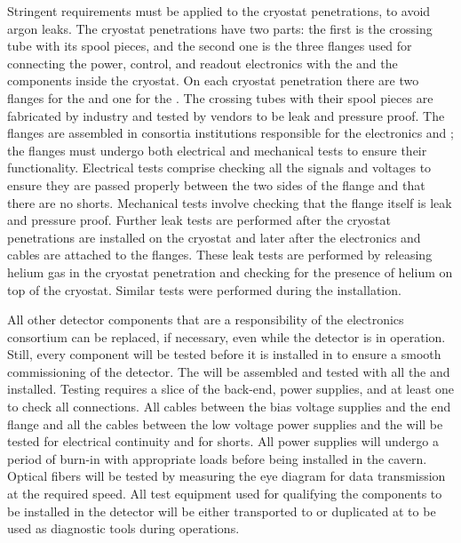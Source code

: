 Stringent requirements must be applied to the cryostat
penetrations, to avoid argon leaks. The cryostat penetrations 
have two parts: the first is the crossing tube with its spool pieces,
and the second one is the three flanges used for
connecting the power, control, and readout electronics with the
 and the  components inside the
cryostat. On each cryostat penetration there are two flanges for
the  and one for the . The crossing
tubes with their spool pieces are fabricated by industry and tested
by vendors to be leak and pressure proof. The flanges are assembled
in consortia institutions responsible for the  electronics and ; the
flanges must undergo both electrical and mechanical tests to ensure their
functionality. Electrical tests comprise checking all the
signals and voltages to ensure they are passed properly between the two sides of the
flange and that there are no shorts. Mechanical tests involve 
checking that the flange itself is leak and pressure proof. Further
leak tests are performed after the cryostat penetrations are installed
on the cryostat and later after the  electronics and 
cables are attached to the flanges. These leak tests are
performed by releasing helium gas in the cryostat penetration and
checking for the presence of helium on top of the cryostat. Similar
tests were performed during the  installation.

All other detector components that are a responsibility of
the  electronics consortium can be replaced, if necessary,
even while the detector is in operation. Still, every component
will be tested before it is installed in  to ensure a
smooth commissioning of the detector. The  will be
assembled and tested with all the  and 
installed. Testing requires a slice of the  back-end,
power supplies, and at least one  to check all 
connections. All cables between the bias voltage supplies and
the end flange and all the cables between the low voltage power
supplies and the  will be tested for electrical
continuity and for shorts. All power supplies will undergo a
period of burn-in with appropriate loads before being installed
in the cavern. Optical fibers will be tested by measuring the
eye diagram for data transmission at the required speed. All
test equipment used for qualifying the components to be installed
in the detector will be either transported to  or duplicated
at  to be used as diagnostic tools during operations.

